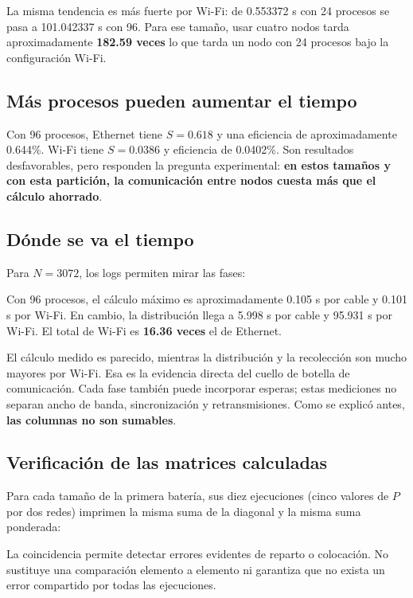 La misma tendencia es más fuerte por Wi-Fi: de 0.553372 s con 24 procesos se pasa a 101.042337 s con 96. Para ese tamaño, usar cuatro nodos tarda aproximadamente \textbf{182.59 veces} lo que tarda un nodo con 24 procesos bajo la configuración Wi-Fi.

\clearpage
\subsection{Más procesos pueden aumentar el tiempo}



Con 96 procesos, Ethernet tiene $S=0.618$ y una eficiencia de aproximadamente 0.644\%. Wi-Fi tiene $S=0.0386$ y eficiencia de 0.0402\%. Son resultados desfavorables, pero responden la pregunta experimental: \textbf{en estos tamaños y con esta partición, la comunicación entre nodos cuesta más que el cálculo ahorrado}.

\clearpage
\subsection{Dónde se va el tiempo}
Para $N=3072$, los logs permiten mirar las fases:


Con 96 procesos, el cálculo máximo es aproximadamente 0.105 s por cable y 0.101 s por Wi-Fi. En cambio, la distribución llega a 5.998 s por cable y 95.931 s por Wi-Fi. El total de Wi-Fi es \textbf{16.36 veces} el de Ethernet.

El cálculo medido es parecido, mientras la distribución y la recolección son mucho mayores por Wi-Fi. Esa es la evidencia directa del cuello de botella de comunicación. Cada fase también puede incorporar esperas; estas mediciones no separan ancho de banda, sincronización y retransmisiones. Como se explicó antes, \textbf{las columnas no son sumables}.

\subsection{Verificación de las matrices calculadas}
Para cada tamaño de la primera batería, sus diez ejecuciones (cinco valores de $P$ por dos redes) imprimen la misma suma de la diagonal y la misma suma ponderada:

La coincidencia permite detectar errores evidentes de reparto o colocación. No sustituye una comparación elemento a elemento ni garantiza que no exista un error compartido por todas las ejecuciones.

